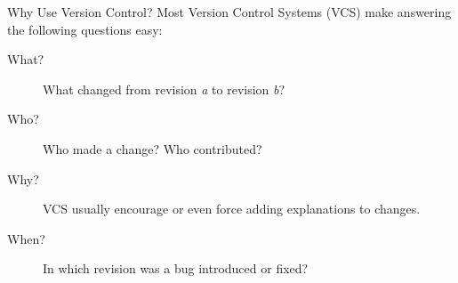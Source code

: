 \begin{frame}[c]{Why Use Version Control?}
  Most Version Control Systems (VCS) make answering the following questions easy:
  \begin{description}
    \item[What?] What changed from revision \emph{a} to revision \emph{b}?
    \item[Who?] Who made a change? Who contributed?
    \item[Why?] VCS usually encourage or even force adding explanations to changes.
    \item[When?] In which revision was a bug introduced or fixed?
  \end{description}

\end{frame}
